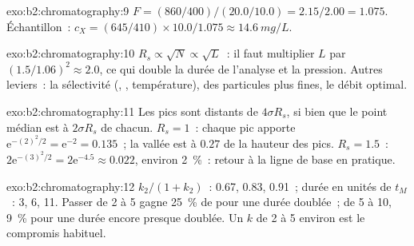 \begin{solution}{exo:b2:chromatography:9}
$F = (860/400)/(20.0/10.0) = 2.15/2.00 = 1.075$. Échantillon~: $c_X = (645/410) \times 10.0/1.075 \approx
\qty{14.6}{mg/L}$.
\end{solution}

\begin{solution}{exo:b2:chromatography:10}
$R_s \propto \sqrt N \propto \sqrt L$~: il faut multiplier $L$ par $(1.5/1.06)^2 \approx 2.0$, ce qui double
la durée de l'analyse et la pression. Autres leviers~: la sélectivité (, ,
température), des particules plus fines, le débit optimal.
\end{solution}

\begin{solution}{exo:b2:chromatography:11}
Les pics sont distants de $4\sigma R_s$, si bien que le point médian est à $2\sigma R_s$ de chacun. $R_s = 1$~: chaque pic
apporte $\mathrm e^{-(2)^2/2} = \mathrm e^{-2} = 0.135$~; la vallée est à $0.27$ de la hauteur des pics.
$R_s = 1.5$~: $2\mathrm e^{-(3)^2/2} = 2\mathrm e^{-4.5} \approx 0.022$, environ 2~\%~: retour à la ligne de
base en pratique.
\end{solution}

\begin{solution}{exo:b2:chromatography:12}
$k_2/(1+k_2)$~: 0.67, 0.83, 0.91~; durée en unités de $t_M$~: 3, 6, 11. Passer de 2 à 5 gagne 25~\% de
 pour une durée doublée~; de 5 à 10, 9~\% pour une durée encore presque doublée. Un $k$ de 2 à 5
environ est le compromis habituel.
\end{solution}

